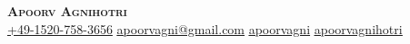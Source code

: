 \begin{center}
    \textbf{\Huge \scshape Apoorv Agnihotri} \\ \vspace{1pt}
    \href{tel:+49-1520-758-3656} { +49-1520-758-3656} \quad
    \href{mailto:apoorvagni@gmail.com}{ \underline{apoorvagni@gmail.com}} \quad
    \href{https://www.linkedin.com/in/apoorvagni/}{ \underline{apoorvagni}} \quad
    \href{https://github.com/apoorvagnihotri/}{ \underline{apoorvagnihotri}}
\end{center}